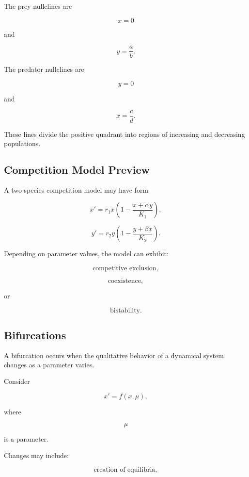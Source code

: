 The prey nullclines are

\[
\boxed{
x=0
}
\]

and

\[
\boxed{
y=\frac{a}{b}.
}
\]

The predator nullclines are

\[
\boxed{
y=0
}
\]

and

\[
\boxed{
x=\frac{c}{d}.
}
\]

These lines divide the positive quadrant into regions of increasing and
decreasing populations.

\subsection{Competition Model Preview}
\label{subsec:competition-model-preview}

A two-species competition model may have form

\[
\boxed{
x'
=
r_1x
\left(
1-\frac{x+\alpha y}{K_1}
\right),
}
\]

\[
\boxed{
y'
=
r_2y
\left(
1-\frac{y+\beta x}{K_2}
\right).
}
\]

Depending on parameter values, the model can exhibit:

\[
\boxed{
\text{competitive exclusion},
}
\]

\[
\boxed{
\text{coexistence},
}
\]

or

\[
\boxed{
\text{bistability}.
}
\]

\subsection{Bifurcations}
\label{subsec:bifurcations}

A bifurcation occurs when the qualitative behavior of a dynamical system
changes as a parameter varies.

Consider

\[
\boxed{
x'
=
f(x,\mu),
}
\]

where

\[
\mu
\]

is a parameter.

Changes may include:

\[
\boxed{
\text{creation of equilibria},
}
\]

